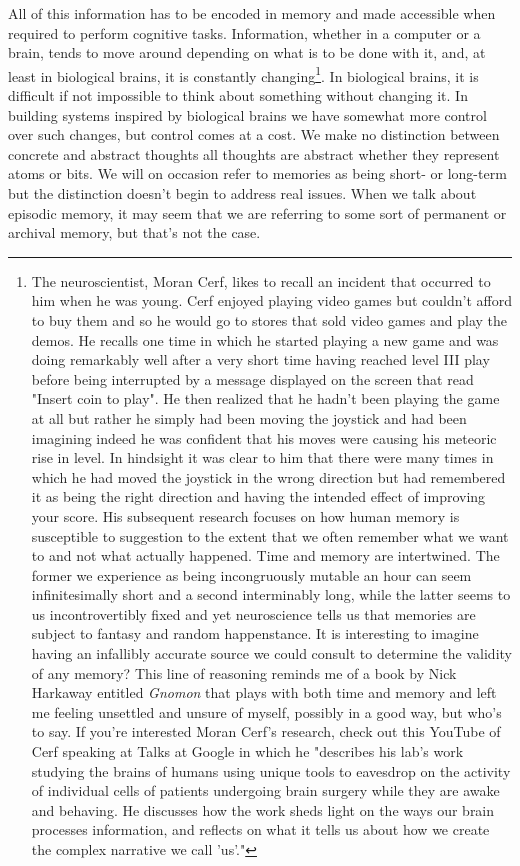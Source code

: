 All of this information has to be encoded in memory and made accessible when required to perform cognitive tasks. Information, whether in a computer or a brain, tends to move around depending on what is to be done with it, and, at least in biological brains, it is constantly changing\footnote{%
%
  The neuroscientist, Moran Cerf, likes to recall an incident that occurred to him when he was young. Cerf enjoyed playing video games but couldn't afford to buy them and so he would go to stores that sold video games and play the demos. He recalls one time in which he started playing a new game and was doing remarkably well after a very short time having reached level III play before being interrupted by a message displayed on the screen that read "Insert coin to play". He then realized that he hadn't been playing the game at all but rather he simply had been moving the joystick and had been imagining \emdash{} indeed he was confident that \emdash{} his moves were causing his meteoric rise in level. In hindsight it was clear to him that there were many times in which he had moved the joystick in the wrong direction but had remembered it as being the right direction and having the intended effect of improving your score. His subsequent research focuses on how human memory is susceptible to suggestion to the extent that we often remember what we want to and not what actually happened. Time and memory are intertwined. The former we experience as being incongruously mutable \emdash{} an hour can seem infinitesimally short and a second interminably long, while the latter seems to us incontrovertibly fixed and yet neuroscience tells us that memories are subject to fantasy and random happenstance. It is interesting to imagine having an infallibly accurate source we could consult to determine the validity of any memory?  This line of reasoning reminds me of a book by Nick Harkaway entitled {\it{Gnomon}} that plays with both time and memory and left me feeling unsettled and unsure of myself, possibly in a good way, but who's to say. If you're interested Moran Cerf's research, check out this YouTube{} of Cerf speaking at Talks at Google in which he "describes his lab's work studying the brains of humans using unique tools to eavesdrop on the activity of individual cells of patients undergoing brain surgery while they are awake and behaving. He discusses how the work sheds light on the ways our brain processes information, and reflects on what it tells us about how we create the complex narrative we call 'us'."}. In biological brains, it is difficult if not impossible to think about something without changing it. In building systems inspired by biological brains we have somewhat more control over such changes, but control comes at a cost. We make no distinction between concrete and abstract thoughts \emdash{} all thoughts are abstract whether they represent atoms or bits. We will on occasion refer to memories as being short- or long-term but the distinction doesn't begin to address real issues. When we talk about episodic memory, it may seem that we are referring to some sort of permanent or archival memory, but that's not the case.

